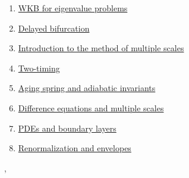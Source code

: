 \documentclass[11pt]{article}
\renewcommand{\today}{\shortmonthname[\the\month] \the \day,  \the\year}
\begin{document}
\begin{enumerate}
	\item \href{https://mp.weixin.qq.com/s/HSYv_akuqiwpRzNNt3biAg}{WKB for eigenvalue problems}	%
	\item \href{https://mp.weixin.qq.com/s/5pdjtd2sD281hJnhv7px0A}{Delayed bifurcation}	%
	\item \href{https://mp.weixin.qq.com/s/rd1yvdzwger5BW3UfpNrlg}{Introduction to the method of multiple scales}	%
	\item \href{https://mp.weixin.qq.com/s/9pnUFfxiHVSllfAe6i2b6w}{Two-timing}	%
	\item \href{https://mp.weixin.qq.com/s/R_0Q_xOt137YUCV7nMraOw}{Aging spring and adiabatic invariants}	%
	\item \href{https://mp.weixin.qq.com/s/IJe10L-_RWfEauvYZUl_MA}{Difference equations and multiple scales}	%
	\item \href{https://mp.weixin.qq.com/s/oXJFjp5bDARCNzMnvQ5nPg}{PDEs and boundary layers}	%
	\item \href{https://mp.weixin.qq.com/s/UAE3iMFgfNQCncWnuv61pg}{Renormalization and envelopes}	%
\end{enumerate}




%
\begin{flushright}
	\tiny \today 
\end{flushright}
\end{document}
